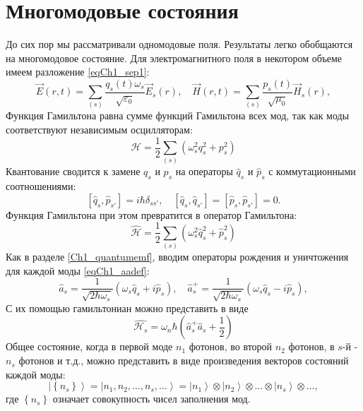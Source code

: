 \section{Многомодовые состояния}
До сих пор мы рассматривали одномодовые поля. Результаты легко
обобщаются на многомодовое состояние. Для электромагнитного поля в
некотором объеме имеем разложение \eqref{eqCh1_sep1}:
\begin{equation}
\vec{E}\left(r, t\right) = \sum_{(s)}
\frac{q_s\left(t\right) \omega_s}{\sqrt{\varepsilon_0}} \vec{E}_s\left(r\right),
\quad
\vec{H}\left(r, t\right) = \sum_{(s)}
\frac{p_s\left(t\right)}{\sqrt{\mu_0}} \vec{H}_s\left(r\right),
\end{equation}
Функция Гамильтона равна сумме функций Гамильтона всех мод, так как
моды соответствуют независимым осцилляторам: 
\begin{equation}
\mathcal{H} = \frac{1}{2} 
\sum_{(s)} \left(\omega_s^2 q_s^2 + p_s^2 \right)
\end{equation}
Квантование сводится к замене $q_s$ и $p_s$   на операторы $\hat{q}_s$
и $\hat{p}_s$ с коммутационными соотношениями: 
\begin{equation}
\left[\hat{q}_s, \hat{p}_{s'}\right] = i\hbar \delta_{ss'},
\quad 
\left[\hat{q}_s, \hat{q}_{s'}\right] = \left[\hat{p}_s,
  \hat{p}_{s'}\right] = 0.
\end{equation}
Функция Гамильтона при этом превратится в оператор Гамильтона:
\begin{equation}
\hat{\mathcal{H}} = \frac{1}{2} \sum_{(s)} \left(\omega_s^2 \hat{q}_s^2 + \hat{p}_s^2 \right)
\end{equation}
Как в разделе \ref{Ch1_quantumemf}, вводим операторы рождения и
уничтожения для каждой моды \eqref{eqCh1_aadef}: 
\begin{equation}
\hat{a}_s = \frac{1}{\sqrt{2 \hbar \omega_s}}
\left( \omega_s \hat{q}_s + i \hat{p}_s\right),
\quad
\hat{a}_s^{+} = \frac{1}{\sqrt{2 \hbar \omega_s}}
\left( \omega_s \hat{q}_s - i \hat{p}_s\right),
\end{equation}
С их помощью гамильтониан можно представить в виде
\begin{equation}
\hat{\mathcal{H}_s} = \omega_n \hbar 
\left(\hat{a}_s^{+} \hat{a}_s + \frac{1}{2}\right)
\nonumber
\end{equation}
Общее состояние, когда в первой моде $n_1$ фотонов, во второй $n_2$
фотонов, в  $s$-й - $n_s$ фотонов и т.д., можно представить в виде
произведения векторов состояний каждой моды: 
\begin{equation}
\left|\left\{n_s\right\}\right> = 
\left|n_1, n_2, \dots, n_s, \dots\right> =
\left|n_1\right> \otimes
\left|n_2\right> \otimes
\dots
\otimes
\left|n_s\right> \otimes
\dots, 
\nonumber
\end{equation}
где $\left\{n_s\right\}$ означает совокупность чисел заполнения мод.

